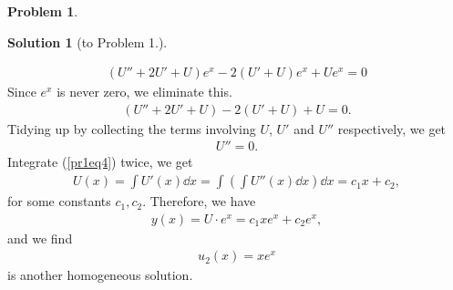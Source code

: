 \documentclass[a4paper]{article}
\theoremstyle{definition}
\newtheorem{Problem}{Problem}
\newtheorem*{Solution}{Solution}
\begin{document}
\begin{Problem}
\begin{Solution}[to Problem 1.]
\begin{itemize}
\begin{align}
    (U''+2U'+U)e^{x} -2(U'+U)e^{x} +Ue^{x}=0
\end{align}
Since $e^{x}$ is never zero, we eliminate this.
\begin{align}
    (U''+2U'+U) -2(U'+U) +U=0.
\end{align}
Tidying up by collecting the terms involving $U$, $U'$ and $U''$ respectively, we get
\begin{align}
    U''=0.\label{pr1eq4}
\end{align}
Integrate (\ref*{pr1eq4}) twice, we get
\begin{align}
    U(x) = \int U'(x) \dd x = \int \left(\int U''(x)\dd x\right)\dd x = c_1x+c_2,
\end{align}
for some constants $c_{1},c_{2}$. Therefore, we have
\begin{align}
    y(x) = U\cdot e^{x}  =c_{1}xe^{x}+c_{2}e^{x},
\end{align}
and we find 
\begin{align}
    u_{2}(x)= xe^{x}
\end{align}
is another homogeneous solution.\\


\end{itemize}
\end{Solution}
\end{Problem}
\end{document}
